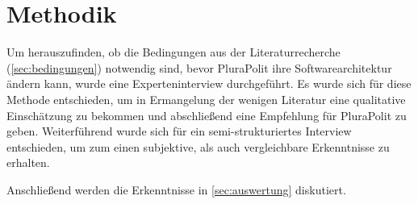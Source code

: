 \section{Methodik}
\label{sec:methodik}


Um herauszufinden, ob die Bedingungen aus der Literaturrecherche (\cref{sec:bedingungen}) notwendig sind, bevor PluraPolit ihre Softwarearchitektur ändern kann, wurde eine Experteninterview durchgeführt. Es wurde sich für diese Methode entschieden, um in Ermangelung der wenigen Literatur eine qualitative Einschätzung zu bekommen und abschließend eine Empfehlung für PluraPolit zu geben. Weiterführend wurde sich für ein semi-strukturiertes Interview entschieden, um zum einen subjektive, als auch vergleichbare Erkenntnisse zu erhalten.

Anschließend werden die Erkenntnisse in \cref{sec:auswertung} diskutiert.







